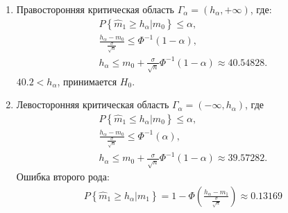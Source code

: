 \documentclass[a4paper,12pt]{article}
\newcommand{\probability}[1]{P \left\{ #1 \right\}}
\begin{document}
    \begin{enumerate}
        \item Правосторонняя критическая область $\Gamma_\alpha = (h_\alpha, + \infty)$, где:
              \begin{gather*}
                  \probability{\widehat{m}_1 \ge h_\alpha | m_0} \le \alpha , \\
                  \frac{h_\alpha - m_0}{\frac{\sigma}{\sqrt{n}}} \le \Phi^{-1} (1 - \alpha) , \\
                  h_\alpha
                  \le m_0 + \frac{\sigma}{\sqrt{n}} \Phi^{-1} (1 - \alpha)
                  \approx 40.54828 .
              \end{gather*}
              $40.2 < h_\alpha$, принимается $H_0$.

        \item Левосторонняя критическая область $\Gamma_\alpha = (- \infty, h_\alpha)$, где        \begin{gather*}
                  \probability{\widehat{m}_1 \le h_\alpha | m_0} \le \alpha , \\
                  \frac{h_\alpha - m_0}{\frac{\sigma}{\sqrt{n}}} \le \Phi^{-1} (\alpha) , \\
                  h_\alpha
                  \le m_0 + \frac{\sigma}{\sqrt{n}} \Phi^{-1} (1 - \alpha)
                  \approx 39.57282 .
              \end{gather*}
              Ошибка второго рода:
              \begin{gather*}
                  \probability{\widehat{m}_1 \ge h_\alpha | m_1}
                  = 1 - \Phi \left( \frac{h_\alpha - m_1}{\frac{\sigma}{\sqrt{n}}} \right)
                  \approx 0.13169
              \end{gather*}


\end{enumerate}
\end{document}
